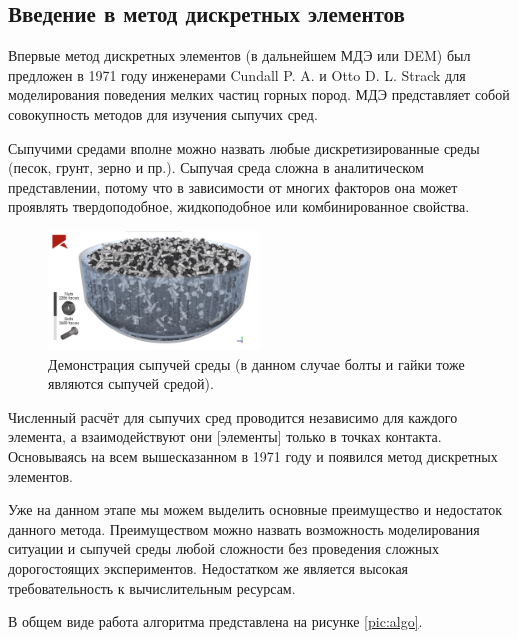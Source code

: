 \documentclass[utf8x, 14pt, oneside, a4paper]{article}
\begin{document}
\subsection*{Введение в метод дискретных элементов}

Впервые метод дискретных элементов (в дальнейшем МДЭ или DEM) был предложен в 1971 году инженерами Cundall P. A. и Otto D. L. Strack \cite{cundall} для моделирования поведения мелких частиц горных пород. 
МДЭ представляет собой совокупность методов для изучения сыпучих сред. 

Сыпучими средами вполне можно назвать любые дискретизированные среды (песок, грунт, зерно и пр.). 
Сыпучая среда сложна в аналитическом представлении, потому что в зависимости от многих факторов она может проявлять твердоподобное, жидкоподобное или комбинированное свойства. 

\begin{figure}[H]
	\centering
	\includegraphics[width=0.5\textwidth]{sreda}
	\caption{Демонстрация сыпучей среды (в данном случае болты и гайки тоже являются сыпучей средой).}
\end{figure} 

Численный расчёт для сыпучих сред проводится независимо для каждого элемента, а взаимодействуют они [элементы] только в точках контакта. 
Основываясь на всем вышесказанном в 1971 году и появился метод дискретных элементов.

Уже на данном этапе мы можем выделить основные преимущество и недостаток данного метода. 
Преимуществом можно назвать возможность моделирования ситуации и сыпучей среды любой сложности без проведения сложных дорогостоящих экспериментов. 
Недостатком же является высокая требовательность к вычислительным ресурсам.

В общем виде работа алгоритма представлена на рисунке \ref{pic:algo}.
\end{document}
